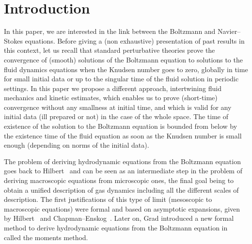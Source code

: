 \documentclass[11pt]{article}
\theoremstyle{definition}
\numberwithin{equation}{section}
\numberwithin{figure}{section}
\numberwithin{table}{section}
\begin{document}
\section{Introduction}
In this paper, we are interested in the link between the Boltzmann and Navier--Stokes equations. Before giving a (non exhaustive) presentation of past results in this context, let us recall that standard perturbative theories prove the convergence of (smooth) solutions of the Boltzmann equation to solutions to the fluid dynamics equations when the Knudsen number goes to zero, globally in time for small initial data or up to the singular time of the fluid solution in periodic settings. In this paper we propose a different approach, intertwining fluid mechanics and kinetic estimates, which enables us to prove (short-time) convergence without any smallness at initial time, and which is valid for any initial data (ill prepared or not) in the case of the whole space. The time of existence of the solution to the Boltzmann equation is bounded from below by the existence time of the fluid equation as soon as the Knudsen number is small enough (depending on norms of the initial data).



The problem of deriving hydrodynamic equations from the Boltzmann equation goes back to Hilbert~\cite{Hilbert} and can be seen as an intermediate step in the problem of deriving macroscopic equations from microscopic ones, the final goal being to obtain a unified description of gas dynamics including all the different scales of description. The first justifications of this type of limit (mesoscopic to macroscopic equations) were formal and based on asymptotic expansions, given by Hilbert~\cite{Hilbert} and Chapman--Enskog~\cite{ChapEns}. Later on, Grad introduced a new formal method to derive hydrodynamic equations from the Boltzmann equation in~\cite{Gradhydro} called the moments method.
\end{document}
